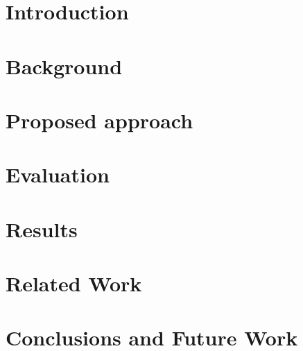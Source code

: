 \documentclass[sigconf]{acmart}
\begin{document}


\maketitle
	\section{Introduction}
\label{sec:Introduction}


\section{Background}
\label{sec:Background}




\section{Proposed approach}
\label{sec:ProposedApproach}


\section{Evaluation}		
\label{sec:Evaluation}


\section{Results}
\label{sec:ExperimentalResults}



\section{Related Work}
\label{sec:RelatedWorks}


\section{Conclusions and Future Work}
\label{sec:Conclusions}





\end{document}
